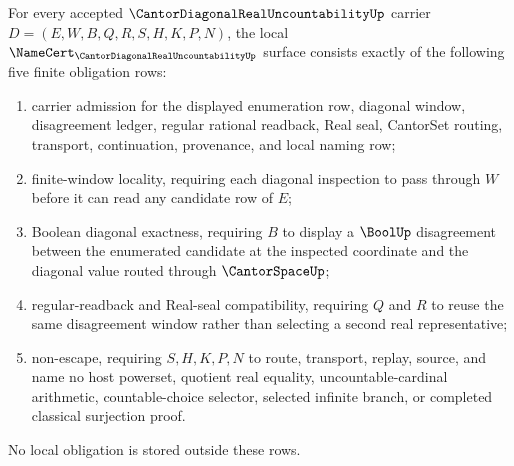 \begin{theorem}
\label{thm:cantor-diagonal-real-uncountability-namecert-obligations}
For every accepted $\CantorDiagonalRealUncountabilityUp$ carrier $D=(E,W,B,Q,R,S,H,K,P,N)$, the local $\NameCert_{\CantorDiagonalRealUncountabilityUp}$ surface consists exactly of the following five finite obligation rows:
\begin{enumerate}
\item carrier admission for the displayed enumeration row, diagonal window, disagreement ledger, regular rational readback, Real seal, CantorSet routing, transport, continuation, provenance, and local naming row;
\item finite-window locality, requiring each diagonal inspection to pass through $W$ before it can read any candidate row of $E$;
\item Boolean diagonal exactness, requiring $B$ to display a $\BoolUp$ disagreement between the enumerated candidate at the inspected coordinate and the diagonal value routed through $\CantorSpaceUp$;
\item regular-readback and Real-seal compatibility, requiring $Q$ and $R$ to reuse the same disagreement window rather than selecting a second real representative;
\item non-escape, requiring $S,H,K,P,N$ to route, transport, replay, source, and name no host powerset, quotient real equality, uncountable-cardinal arithmetic, countable-choice selector, selected infinite branch, or completed classical surjection proof.
\end{enumerate}
No local obligation is stored outside these rows.
\end{theorem}
